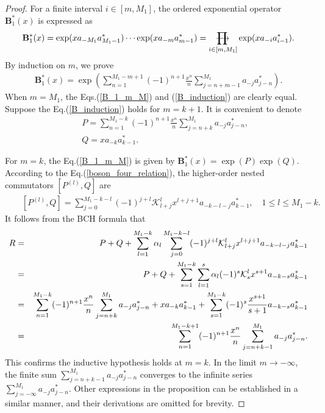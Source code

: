 \documentclass[10pt,a4paper]{amsart}
\numberwithin{equation}{section}
\def\rprod{\mathop{\prod{\mkern-28.0mu}{\mathbf\longrightarrow}}}
\begin{document}
\begin{proof}
For a finite interval $i\in[m,M_{1}]$, the ordered exponential operator $\mathbf{B}^{\ast}_{1}(x)$ is expressed as
\begin{eqnarray}\label{B_1_m_M}
\mathbf{B}^{\ast}_{1}(x)=\exp(xa_{-M_{1}}a^{\ast}_{M_{1}-1})
\cdots\exp(xa_{-m}a^{\ast}_{m-1})=\rprod\limits
_{i\in[m,M_{1}]}\exp(xa_{-i}a^{\ast}_{i-1}).
\end{eqnarray}
By induction on $m$, we prove
\begin{eqnarray}\label{B_induction}
\mathbf{B}^{\ast}_{1}(x)=\exp\left(\sum\limits^{M_{1}-m+1}_{n=1}(-1)^{n+1}
\frac{x^{n}}{n}\sum\limits^{M_{1}}_{j=n+m-1}a_{-j}a^{\ast}_{j-n}\right).
\end{eqnarray}
When $m=M_{1}$, the Eqs.(\ref{B_1_m_M}) and (\ref{B_induction})  are clearly equal. Suppose the Eq.(\ref{B_induction}) holds for $m=k+1$. It is convenient to denote
\begin{eqnarray}
&&P=\sum\limits^{M_{1}-k}_{n=1}(-1)^{n+1}
\frac{x^{n}}{n}\sum\limits^{M_{1}}_{j=n+k}a_{-j}a^{\ast}_{j-n},\\
&&Q=xa_{-k}a^{\ast}_{k-1}.
\end{eqnarray}


For $m=k$, the Eq.(\ref{B_1_m_M}) is given by $\mathbf{B}^{\ast}_{1}(x)=\exp(P)\exp(Q)$. According to the Eq.(\ref{boson_four_relation}), the higher-order nested commutators $[P^{(l)},Q]$ are
\begin{eqnarray}
&&[P^{(l)},Q]=\sum\limits^{M_{1}-k-l}_{j=0}(-1)^{j+l}\mathcal{K}^{l}_{l+j}x^{l+j+1}
a_{-k-l-j}a^{\ast}_{k-1},\quad 1\leq l\leq M_{1}-k.
\end{eqnarray}
It follows from the BCH formula that
\begin{eqnarray}
R&=&P+Q+\sum\limits^{M_{1}-k}_{l=1}\alpha_{l}\sum\limits^{M_{1}-k-l}_{j=0}(-1)^{j+l}
\mathcal{K}^{l}_{l+j}x^{l+j+1}a_{-k-l-j}a^{\ast}_{k-1}\notag\\
&=&P+Q+\sum\limits^{M_{1}-k}_{s=1}\sum\limits^{s}_{l=1}\alpha_{l}(-1)^{s}
\mathcal{K}^{l}_{s}x^{s+1}a_{-k-s}a^{\ast}_{k-1}\notag\\
&=&\sum\limits^{M_{1}-k}_{n=1}(-1)^{n+1}
\frac{x^{n}}{n}\sum\limits^{M_{1}}_{j=n+k}a_{-j}a^{\ast}_{j-n}+xa_{-k}a^{\ast}_{k-1}
+\sum\limits^{M_{1}-k}_{s=1}(-1)^{s}\frac{x^{s+1}}{s+1}a_{-k-s}a^{\ast}_{k-1}\notag\\
&=&\sum\limits^{M_{1}-k+1}_{n=1}(-1)^{n+1}\frac{x^{n}}{n}\sum\limits^{M_{1}}_{j=n+k-1}
a_{-j}a^{\ast}_{j-n}.
\end{eqnarray}
This confirms the inductive hypothesis holds at $m=k$. In the limit $m\rightarrow-\infty$, the finite sum $\sum\limits^{M_{1}}_{j=n+k-1}
a_{-j}a^{\ast}_{j-n}$ converges to the infinite series $\sum\limits^{M_{1}}_{j=-\infty}
a_{-j}a^{\ast}_{j-n}$. Other expressions in the proposition can be established in a similar manner, and their derivations are omitted for brevity.
\end{proof}
\end{document}
